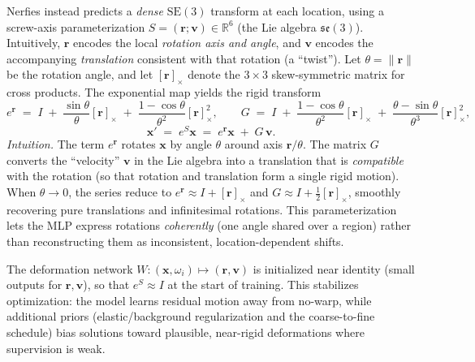\begin{enrichment}
\begin{enrichment}
        Nerfies instead predicts a \emph{dense} \(\mathrm{SE}(3)\) transform at each location, using a screw-axis parameterization \(S=(\mathbf{r};\mathbf{v})\in\mathbb{R}^{6}\) (the Lie algebra \(\mathfrak{se}(3)\)). Intuitively, \(\mathbf{r}\) encodes the local \emph{rotation axis and angle}, and \(\mathbf{v}\) encodes the accompanying \emph{translation} consistent with that rotation (a “twist”). Let \(\theta=\|\mathbf{r}\|\) be the rotation angle, and let \([\mathbf{r}]_\times\) denote the \(3{\times}3\) skew-symmetric matrix for cross products. The exponential map yields the rigid transform
        \[
        e^{\mathbf{r}} \;=\; I \;+\; \frac{\sin\theta}{\theta}[\mathbf{r}]_\times \;+\; \frac{1-\cos\theta}{\theta^{2}}[\mathbf{r}]_\times^{2},\qquad
        G \;=\; I \;+\; \frac{1-\cos\theta}{\theta^{2}}[\mathbf{r}]_\times \;+\; \frac{\theta-\sin\theta}{\theta^{3}}[\mathbf{r}]_\times^{2},
        \]
        \[
        \mathbf{x}' \;=\; e^{S}\mathbf{x} \;=\; e^{\mathbf{r}}\mathbf{x} \;+\; G\,\mathbf{v}.
        \]
        \emph{Intuition.} The term \(e^{\mathbf{r}}\) rotates \(\mathbf{x}\) by angle \(\theta\) around axis \(\mathbf{r}/\theta\). The matrix \(G\) converts the “velocity” \(\mathbf{v}\) in the Lie algebra into a translation that is \emph{compatible} with the rotation (so that rotation and translation form a single rigid motion). When \(\theta\to 0\), the series reduce to \(e^{\mathbf{r}}\!\approx I+[\mathbf{r}]_\times\) and \(G\!\approx I+\tfrac{1}{2}[\mathbf{r}]_\times\), smoothly recovering pure translations and infinitesimal rotations. This parameterization lets the MLP express rotations \emph{coherently} (one angle shared over a region) rather than reconstructing them as inconsistent, location-dependent shifts.
        
        The deformation network \(W:(\mathbf{x},\omega_i)\mapsto(\mathbf{r},\mathbf{v})\) is initialized near identity (small outputs for \(\mathbf{r},\mathbf{v}\)), so that \(e^{S}\!\approx I\) at the start of training. This stabilizes optimization: the model learns residual motion away from no-warp, while additional priors (elastic/background regularization and the coarse-to-fine schedule) bias solutions toward plausible, near-rigid deformations where supervision is weak.
        

\end{enrichment}
\end{enrichment}
